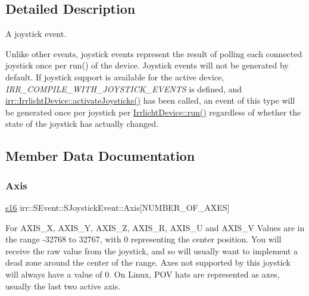 \subsection{Detailed Description}
A joystick event. 

Unlike other events, joystick events represent the result of polling each connected joystick once per run() of the device. Joystick events will not be generated by default. If joystick support is available for the active device, {\itshape I\+R\+R\+\_\+\+C\+O\+M\+P\+I\+L\+E\+\_\+\+W\+I\+T\+H\+\_\+\+J\+O\+Y\+S\+T\+I\+C\+K\+\_\+\+E\+V\+E\+N\+TS} is defined, and \hyperlink{classirr_1_1IrrlichtDevice_af06f8d2c4fdffd1f879e46685bcbc6e3}{irr\+::\+Irrlicht\+Device\+::activate\+Joysticks()} has been called, an event of this type will be generated once per joystick per \hyperlink{classirr_1_1IrrlichtDevice_a0489f8151dc43f6f41503ffb5a160b35}{Irrlicht\+Device\+::run()} regardless of whether the state of the joystick has actually changed. 

\subsection{Member Data Documentation}
\mbox{\label{structirr_1_1SEvent_1_1SJoystickEvent_a1ad2615ffdd8de01b93414228ac3a2d9}} 
\subsubsection{\texorpdfstring{Axis}{Axis}}
{\footnotesize\ttfamily \hyperlink{namespaceirr_a43ace0af066371ac0862bac3f7314220}{s16} irr\+::\+S\+Event\+::\+S\+Joystick\+Event\+::\+Axis\mbox{[}N\+U\+M\+B\+E\+R\+\_\+\+O\+F\+\_\+\+A\+X\+ES\mbox{]}}

For A\+X\+I\+S\+\_\+X, A\+X\+I\+S\+\_\+Y, A\+X\+I\+S\+\_\+Z, A\+X\+I\+S\+\_\+R, A\+X\+I\+S\+\_\+U and A\+X\+I\+S\+\_\+V Values are in the range -\/32768 to 32767, with 0 representing the center position. You will receive the raw value from the joystick, and so will usually want to implement a dead zone around the center of the range. Axes not supported by this joystick will always have a value of 0. On Linux, P\+OV hats are represented as axes, usually the last two active axis. \mbox{\label{structirr_1_1SEvent_1_1SJoystickEvent_a4fd74c22d62c1613405dc3191ccc5b7c}} 
